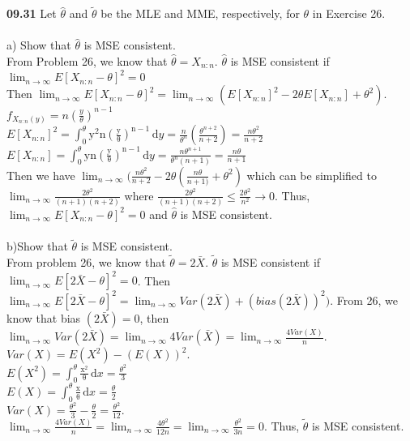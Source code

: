 { \bf 09.31 }
Let $\hat{\theta}$ and $\tilde{\theta}$ be the MLE and MME, respectively, for $\theta$ in Exercise 26. \\
\\
a) Show that $\hat{\theta}$ is MSE consistent. \\
From Problem 26, we know that $\hat{\theta}=X_{n:n}$.  
$\hat{\theta}$ is MSE consistent if $\lim_{n \to \infty} E[X_{n:n}-\theta]^{2} = 0$\\
Then $\lim_{n \to \infty} E[X_{n:n}-\theta]^{2} = \lim_{n \to \infty}(E[X_{n:n}]^2 - 2\theta E[X_{n:n}]+\theta^2).$\\
$f_{X_{n:n}(y)}= n (\frac{y}{\theta})^{n-1}$ \\
$E[X_{n:n}]^2 = \int_0^\theta \mathrm{y^2 n (\frac{y}{\theta})^{n-1}}\, \mathrm{d}y = \frac{n}{\theta^n}(\frac{\theta^{n+2}}{n+2})=\frac{n\theta^2 }{n+2}$\\
 $E[X_{n:n}]= \int_0^\theta \mathrm{y n (\frac{y}{\theta})^{n-1}}\, \mathrm{d}y=\frac{n \theta^{n+1}}{\theta^n (n+1)} =\frac{n\theta}{n+1}$\\
 Then we have $\lim_{n \to \infty}(\frac{n\theta^2 }{n+2}-2\theta(\frac{n\theta}{n+1)}+\theta^2)$ which can be simplified to $\lim_{n \to \infty}\frac{2\theta^2}{(n+1)(n+2)}$ where $\frac{2\theta^2}{(n+1)(n+2)} \leq \frac{2\theta^2}{n^2} \rightarrow 0$.  Thus,  $\lim_{n \to \infty} E[X_{n:n}-\theta]^{2} = 0$ and $\hat{\theta}$ is MSE consistent.\\
 \\
 b)Show that $\tilde{\theta}$ is MSE consistent.\\
 From problem 26, we know that $\tilde{\theta}=2\bar{X}$.  $\tilde{\theta}$ is MSE consistent if  $\lim_{n \to \infty} E[2\bar{X} - \theta]^2 =0$.  Then $\lim_{n \to \infty} E[2\bar{X} - \theta]^2 =\lim_{n \to \infty}Var(2\bar{X})+(bias(2\bar{X}))^2)$.  From 26, we know that bias $(2\bar{X})=0$, then $\lim_{n \to \infty} Var(2\bar{X}) =  \lim_{n \to \infty} 4Var(\bar{X})= \lim_{n \to \infty}\frac{4Var(X)}{n}$.\\
 $Var(X) = E(X^2) - (E(X))^2$.  \\
 $E(X^2)=\int_0^\theta \mathrm{\frac{x^2}{\theta}}\, \mathrm{d}x = \frac{\theta^2}{3}$\\
 $E(X) = \int_0^\theta \mathrm{\frac{x}{\theta}}\, \mathrm{d}x = \frac{\theta}{2}$\\
 $Var(X) = \frac{\theta^2}{3}-\frac{\theta}{2}= \frac{\theta^2}{12}$.\\
 $\lim_{n \to \infty}\frac{4Var(X)}{n} = \lim_{n \to \infty}\frac{4\theta^2}{12n} = \lim_{n \to \infty}\frac{\theta^2}{3n}=0.$
 Thus, $\tilde{\theta}$ is MSE consistent.
